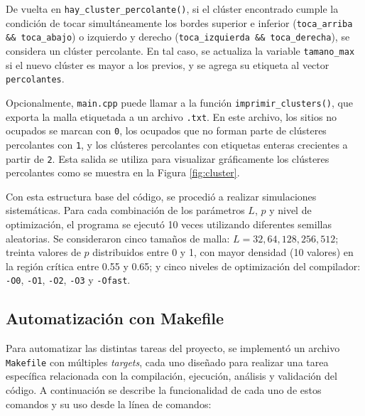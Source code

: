 \documentclass[%
 reprint,
 amsmath,amssymb,
 aps,
]{revtex4-2}
\begin{document}
De vuelta en \texttt{hay\_cluster\_percolante()}, si el clúster encontrado cumple la condición de tocar simultáneamente los bordes superior e inferior (\texttt{toca\_arriba \&\& toca\_abajo}) o izquierdo y derecho (\texttt{toca\_izquierda \&\& toca\_derecha}), se considera un clúster percolante. En tal caso, se actualiza la variable \texttt{tamano\_max} si el nuevo clúster es mayor a los previos, y se agrega su etiqueta al vector \texttt{percolantes}.

Opcionalmente, \texttt{main.cpp} puede llamar a la función \texttt{imprimir\_clusters()}, que exporta la malla etiquetada a un archivo \texttt{.txt}. En este archivo, los sitios no ocupados se marcan con \texttt{0}, los ocupados que no forman parte de clústeres percolantes con \texttt{1}, y los clústeres percolantes con etiquetas enteras crecientes a partir de \texttt{2}. Esta salida se utiliza para visualizar gráficamente los clústeres percolantes como se muestra en la Figura \ref{fig:cluster}.

Con esta estructura base del código, se procedió a realizar simulaciones sistemáticas. Para cada combinación de los parámetros \( L \), \( p \) y nivel de optimización, el programa se ejecutó 10 veces utilizando diferentes semillas aleatorias. Se consideraron cinco tamaños de malla: \( L = 32, 64, 128, 256, 512 \); treinta valores de \( p \) distribuidos entre 0 y 1, con mayor densidad (10 valores) en la región crítica entre 0.55 y 0.65; y cinco niveles de optimización del compilador: \texttt{-O0}, \texttt{-O1}, \texttt{-O2}, \texttt{-O3} y \texttt{-Ofast}.

\subsection{Automatización con Makefile}

Para automatizar las distintas tareas del proyecto, se implementó un archivo \texttt{Makefile} con múltiples \textit{targets}, cada uno diseñado para realizar una tarea específica relacionada con la compilación, ejecución, análisis y validación del código. A continuación se describe la funcionalidad de cada uno de estos comandos y su uso desde la línea de comandos:
\end{document}
